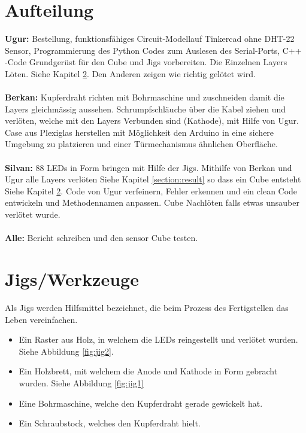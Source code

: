 \documentclass{article}
\begin{document}
\section{Aufteilung}
\textbf{Ugur:} Bestellung, funktionsfähiges \glqq Circuit-Modell\grqq auf Tinkercad ohne DHT-22 Sensor, Programmierung des Python Codes zum Auslesen des Serial-Ports, C++ -Code Grundgerüst für den Cube und Jigs vorbereiten. Die Einzelnen Layers Löten. Siehe Kapitel \ref{section:Jigs}. Den Anderen zeigen wie richtig gelötet wird.\\ \\
\textbf{Berkan:} Kupferdraht richten mit Bohrmaschine und zuschneiden damit die Layers gleichmässig aussehen. Schrumpfschläuche über die Kabel ziehen und verlöten, welche mit den Layers Verbunden sind (Kathode), mit Hilfe von Ugur. Case aus Plexiglas herstellen mit Möglichkeit den Arduino in eine sichere Umgebung zu platzieren und einer Türmechanismus ähnlichen Oberfläche. \\ \\ \textbf{Silvan:} 88 LEDs in Form bringen mit Hilfe der Jigs. Mithilfe von Berkan und Ugur alle Layers verlöten Siehe Kapitel \ref{section:result} so dass ein Cube entsteht Siehe Kapitel \ref{section:Jigs}. Code von Ugur verfeinern, Fehler erkennen und ein clean Code entwickeln und Methodennamen anpassen. Cube Nachlöten falls etwas unsauber verlötet wurde. \\ \\
\textbf{Alle:} Bericht schreiben und den sensor Cube testen. 

\section{Jigs/Werkzeuge}
\label{section:Jigs}
Als Jigs werden Hilfsmittel bezeichnet, die beim Prozess des Fertigstellen das Leben vereinfachen. 
\begin{itemize}
\item Ein Raster aus Holz, in welchem die LEDs reingestellt und verlötet wurden. Siehe Abbildung \ref{fig:jig2}.
\item Ein Holzbrett, mit welchem die Anode und Kathode in Form gebracht wurden. Siehe Abbildung \ref{fig:jig1}
\item Eine Bohrmaschine, welche den Kupferdraht gerade gewickelt hat.
\item Ein Schraubstock, welches den Kupferdraht hielt.   
\end{itemize}
\end{document}

